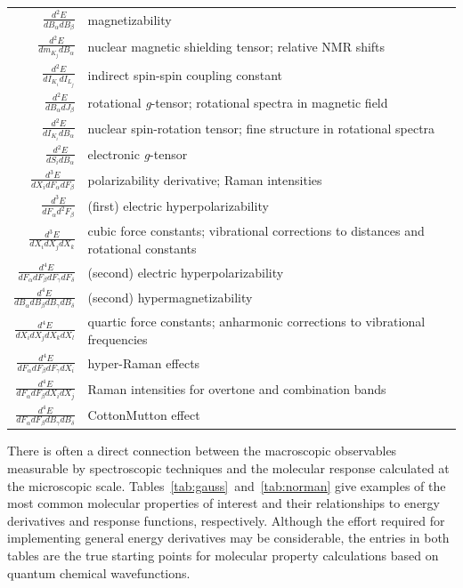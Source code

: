 \documentclass[%
class = book,%
crop = false,%
float = true,%
multi = true,%
preview = false,%
]{standalone}
\begin{document}
\begin{table}
\begin{singlespace}
\begin{tabulary}{1.00\textwidth}{rL}
      \(\frac{d^{2}E}{dB_{\alpha}dB_{\beta}}\)       & magnetizability \\
      \(\frac{d^{2}E}{dm_{K_{j}}dB_{\alpha}}\)       & nuclear magnetic shielding tensor; relative NMR shifts \\
      \(\frac{d^{2}E}{dI_{K_{i}}dI_{L_{j}}}\)        & indirect spin-spin coupling constant \\
      \(\frac{d^{2}E}{dB_{\alpha}dJ_{\beta}}\)       & rotational \textit{g}-tensor; rotational spectra in magnetic field \\
      \(\frac{d^{2}E}{dI_{K_{i}}dB_{\alpha}}\)       & nuclear spin-rotation tensor; fine structure in rotational spectra \\
      \(\frac{d^{2}E}{dS_{i}dB_{\alpha}}\)           & electronic \textit{g}-tensor \\
      \(\frac{d^{3}E}{dX_{i}dF_{\alpha}dF_{\beta}}\) & polarizability derivative; Raman intensities \\
      \(\frac{d^{3}E}{dF_{\alpha}d^{2}F_{\beta}}\)   & (first) electric hyperpolarizability \\
      \(\frac{d^{3}E}{dX_{i}dX_{j}dX_{k}}\)          & cubic force constants; vibrational corrections to distances and rotational constants \\
      \(\frac{d^{4}E}{dF_{\alpha}dF_{\beta}dF_{\gamma}dF_{\delta}}\) & (second) electric hyperpolarizability \\
      \(\frac{d^{4}E}{dB_{\alpha}dB_{\beta}dB_{\gamma}dB_{\delta}}\) & (second) hypermagnetizability \\
      \(\frac{d^{4}E}{dX_{i}dX_{j}dX_{k}dX_{l}}\)                    & quartic force constants; anharmonic corrections to vibrational frequencies \\
      \(\frac{d^{4}E}{dF_{\alpha}dF_{\beta}dF_{\gamma}dX_{i}}\)      & hyper-Raman effects \\
      \(\frac{d^{4}E}{dF_{\alpha}dF_{\beta}dX_{i}dX_{j}}\)           & Raman intensities for overtone and combination bands \\
      \(\frac{d^{4}E}{dF_{\alpha}dF_{\beta}dB_{\gamma}dB_{\delta}}\) & Cotton\textendash{}Mutton effect \\
      \bottomrule
    \end{tabulary}
  \end{singlespace}
\end{table}

There is often a direct connection between the macroscopic observables measurable by spectroscopic techniques and the molecular response calculated at the microscopic scale. Tables~\ref{tab:gauss}~and~\ref{tab:norman} give examples of the most common molecular properties of interest and their relationships to energy derivatives and response functions, respectively. Although the effort required for implementing general energy derivatives may be considerable, the entries in both tables are the true starting points for molecular property calculations based on quantum chemical wavefunctions.
\end{document}
